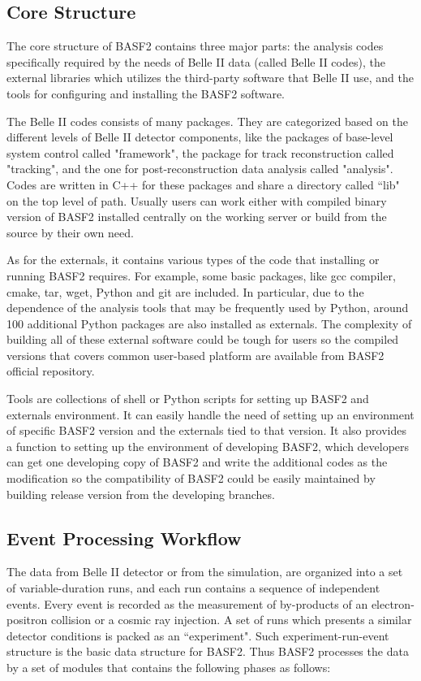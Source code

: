 \subsection{Core Structure}
The core structure of BASF2 contains three major parts: the analysis codes specifically required by the needs of Belle II data (called Belle II codes), the external libraries which utilizes the third-party software that Belle II use, and the tools for configuring and installing the BASF2 software. 

The Belle II codes consists of many packages. They are categorized based on the different levels of Belle II detector components, like the packages of base-level system control called "framework", the package for track reconstruction called "tracking", and the one for post-reconstruction data analysis called "analysis".
Codes are written in C++ for these packages and share a directory called ``lib" on the top level of path. Usually users can work either with compiled binary version of BASF2 installed centrally on the working server or build from the source by their own need. 

As for the externals, it contains various types of the code that installing or running BASF2 requires. For example, some basic packages, like gcc compiler, cmake, tar, wget, Python and git are included. In particular, due to the dependence of the analysis tools that may be frequently used by Python, around 100 additional Python packages are also installed as externals. The complexity of building all of these external software could be tough for users so the compiled versions that covers common user-based platform are available from BASF2 official repository. 

Tools are collections of shell or Python scripts for setting up BASF2 and externals environment. It can easily handle the need of setting up an environment of specific BASF2 version and the externals tied to that version. It also provides a function to setting up the environment of developing BASF2, which developers can get one developing copy of BASF2 and write the additional codes as the modification so the compatibility of BASF2 could be easily maintained by building release version from the developing branches.

\subsection{Event Processing Workflow}
The data from Belle II detector or from the simulation, are organized into a set of variable-duration runs, and each run contains a sequence of independent events. Every event is recorded as the measurement of by-products of an electron-positron collision or a cosmic ray injection. A set of runs which presents a similar detector conditions is packed as an ``experiment". Such experiment-run-event structure is the basic data structure for BASF2. Thus BASF2 processes the data by a set of modules that contains the following phases as follows:

